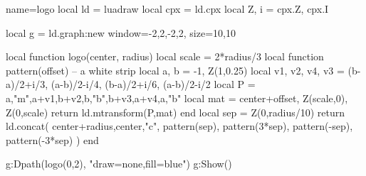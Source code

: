 \documentclass{standalone}
\begin{document}
\begin{luadraw}{name=logo}
local ld = luadraw
local cpx = ld.cpx
local Z, i = cpx.Z, cpx.I

local g = ld.graph:new{ window={-2,2,-2,2}, size={10,10} }

local function logo(center, radius)
    local scale = 2*radius/3
    local function pattern(offset) -- a white strip
        local a, b = -1, Z(1,0.25) 
        local v1, v2, v4, v3 = (b-a)/2+i/3, (a-b)/2-i/4, (b-a)/2+i/6, (a-b)/2-i/2
        local P = {a,"m",a+v1,b+v2,b,"b",b+v3,a+v4,a,"b"}
        local mat = {center+offset, Z(scale,0), Z(0,scale)}
        return ld.mtransform(P,mat)
    end
    local sep = Z(0,radius/10)
    return ld.concat( {center+radius,center,"c"}, pattern(sep), pattern(3*sep), pattern(-sep), pattern(-3*sep) )
end

g:Dpath(logo(0,2), "draw=none,fill=blue")
g:Show()
\end{luadraw}
\end{document}

